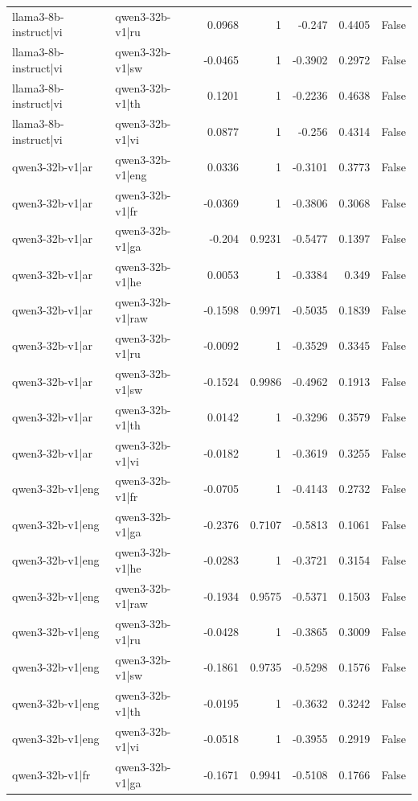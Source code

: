 \begin{table}
\begin{tabular}{l l r r r r l}
llama3-8b-instruct|vi & qwen3-32b-v1|ru & 0.0968 & 1 & -0.247 & 0.4405 & False \\
llama3-8b-instruct|vi & qwen3-32b-v1|sw & -0.0465 & 1 & -0.3902 & 0.2972 & False \\
llama3-8b-instruct|vi & qwen3-32b-v1|th & 0.1201 & 1 & -0.2236 & 0.4638 & False \\
llama3-8b-instruct|vi & qwen3-32b-v1|vi & 0.0877 & 1 & -0.256 & 0.4314 & False \\
qwen3-32b-v1|ar & qwen3-32b-v1|eng & 0.0336 & 1 & -0.3101 & 0.3773 & False \\
qwen3-32b-v1|ar & qwen3-32b-v1|fr & -0.0369 & 1 & -0.3806 & 0.3068 & False \\
qwen3-32b-v1|ar & qwen3-32b-v1|ga & -0.204 & 0.9231 & -0.5477 & 0.1397 & False \\
qwen3-32b-v1|ar & qwen3-32b-v1|he & 0.0053 & 1 & -0.3384 & 0.349 & False \\
qwen3-32b-v1|ar & qwen3-32b-v1|raw & -0.1598 & 0.9971 & -0.5035 & 0.1839 & False \\
qwen3-32b-v1|ar & qwen3-32b-v1|ru & -0.0092 & 1 & -0.3529 & 0.3345 & False \\
qwen3-32b-v1|ar & qwen3-32b-v1|sw & -0.1524 & 0.9986 & -0.4962 & 0.1913 & False \\
qwen3-32b-v1|ar & qwen3-32b-v1|th & 0.0142 & 1 & -0.3296 & 0.3579 & False \\
qwen3-32b-v1|ar & qwen3-32b-v1|vi & -0.0182 & 1 & -0.3619 & 0.3255 & False \\
qwen3-32b-v1|eng & qwen3-32b-v1|fr & -0.0705 & 1 & -0.4143 & 0.2732 & False \\
qwen3-32b-v1|eng & qwen3-32b-v1|ga & -0.2376 & 0.7107 & -0.5813 & 0.1061 & False \\
qwen3-32b-v1|eng & qwen3-32b-v1|he & -0.0283 & 1 & -0.3721 & 0.3154 & False \\
qwen3-32b-v1|eng & qwen3-32b-v1|raw & -0.1934 & 0.9575 & -0.5371 & 0.1503 & False \\
qwen3-32b-v1|eng & qwen3-32b-v1|ru & -0.0428 & 1 & -0.3865 & 0.3009 & False \\
qwen3-32b-v1|eng & qwen3-32b-v1|sw & -0.1861 & 0.9735 & -0.5298 & 0.1576 & False \\
qwen3-32b-v1|eng & qwen3-32b-v1|th & -0.0195 & 1 & -0.3632 & 0.3242 & False \\
qwen3-32b-v1|eng & qwen3-32b-v1|vi & -0.0518 & 1 & -0.3955 & 0.2919 & False \\
qwen3-32b-v1|fr & qwen3-32b-v1|ga & -0.1671 & 0.9941 & -0.5108 & 0.1766 & False \\

\end{tabular}
\end{table}
